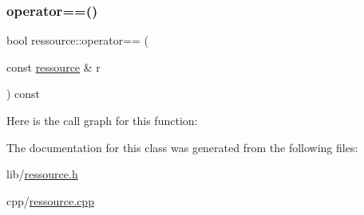 \subsubsection{\texorpdfstring{operator==()}{operator==()}}
{\footnotesize\ttfamily bool ressource\+::operator== (\begin{DoxyParamCaption}\item[{const \hyperlink{classressource}{ressource} \&}]{r }\end{DoxyParamCaption}) const}

Here is the call graph for this function\+:


The documentation for this class was generated from the following files\+:\begin{DoxyCompactItemize}
\item 
lib/\hyperlink{ressource_8h}{ressource.\+h}\item 
cpp/\hyperlink{ressource_8cpp}{ressource.\+cpp}\end{DoxyCompactItemize}
